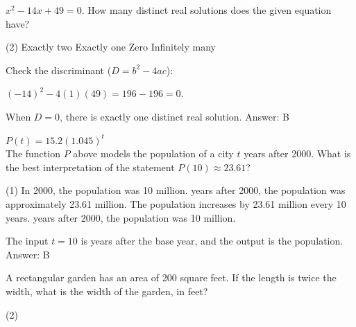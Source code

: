\documentclass[11pt,paper=a4,answers]{exam}
\begin{document}
\begin{questions}
\vspace{1cm}

\question
$x^2 - 14x + 49 = 0$. How many distinct real solutions does the given equation have?
\begin{tasks}(2)
    \task Exactly two \task Exactly one \task Zero \task Infinitely many
\end{tasks}

\begin{solution}
Check the discriminant ($D = b^2 - 4ac$):
\vspace{5pt}
\begin{center}
$(-14)^2 - 4(1)(49) = 196 - 196 = 0$.
\end{center}
\vspace{5pt}
When $D=0$, there is exactly one distinct real solution.
\vspace{5pt}
Answer: \colorbox{yellow!100}{B}
\end{solution}

\vspace{1cm}

\question
$P(t) = 15.2(1.045)^t$ \\
The function $P$ above models the population of a city $t$ years after 2000. What is the best interpretation of the statement $P(10) \approx 23.61$?
\begin{tasks}(1)
    \task In 2000, the population was 10 million.
     years after 2000, the population was approximately 23.61 million.
    \task The population increases by 23.61 million every 10 years.
     years after 2000, the population was 10 million.
\end{tasks}

\begin{solution}
The input $t=10$ is years after the base year, and the output is the population.
\vspace{5pt}
Answer: \colorbox{yellow!100}{B}
\end{solution}

\vspace{1cm}

\question
A rectangular garden has an area of 200 square feet. If the length is twice the width, what is the width of the garden, in feet?
\begin{tasks}(2)
       
\end{tasks}


\end{questions}
\end{document}
